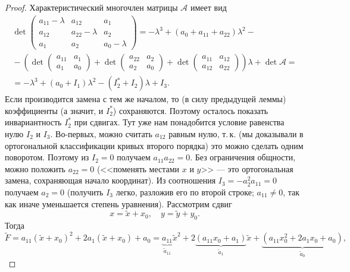 \begin{proof}
    Характеристический многочлен матрицы $\mathcal{A}$ имеет вид
    $$
    \begin{array}{c}\displaystyle
        \det
        \begin{pmatrix}
            a_{11} - \lambda & a_{12} & a_1\\
            a_{12} & a_{22} - \lambda & a_2\\
            a_1 & a_2 & a_0 - \lambda
        \end{pmatrix} = 
        -\lambda^3 + (a_0 + a_{11} + a_{22})\lambda^2 - {}\\\displaystyle {} - \left(
            \det
            \begin{pmatrix}
                a_{11} & a_1\\
                a_1 & a_0
            \end{pmatrix} + \det
            \begin{pmatrix}
                a_{22} & a_2\\
                a_2 & a_0
            \end{pmatrix} + \det
            \begin{pmatrix}
                a_{11} & a_{12}\\
                a_{12} & a_{22}
            \end{pmatrix}
        \right)\lambda + \det \mathcal{A} = {}\\\displaystyle {} = 
        -\lambda^3 + (a_0 + I_1)\lambda^2 - (I_2^\ast + I_2)\lambda + I_3.
    \end{array}
    $$
    Если производится замена с тем же началом, то (в силу предыдущей леммы) коэффициенты (а значит, и $I_2^\ast$) сохраняются. Поэтому осталось показать инвариантность $I_2^\ast$ при сдвигах. Тут уже нам понадобится условие равенства нулю $I_2$ и $I_3$. Во-первых, можно считать $a_{12}$ равным нулю, т.\,к. (мы доказывали в ортогональной классификации кривых второго порядка) это можно сделать одним поворотом. Поэтому из $I_2 = 0$ получаем $a_{11}a_{22} = 0$. Без ограничения общности, можно положить $a_{22} = 0$ (<<поменять местами $x$ и $y$>> --- это ортогональная замена, сохраняющая начало координат). Из соотношения $I_3 = -a_2^2a_{11} = 0$ получаем $a_2 = 0$ (получить $I_3$ легко, разложив его по второй строке; $a_{11} \ne 0$, так как иначе уменьшается степень уравнения). Рассмотрим сдвиг
    $$
    x = \widetilde{x} + x_0,\quad y = \widetilde{y} + y_0.
    $$
    Тогда
    $$
    \widetilde{F} = a_{11}(\widetilde{x} + x_0)^2 + 2a_1(\widetilde{x} + x_0) + a_0 = \underbrace{a_{11}}_{\widetilde{a}_{11}}\widetilde{x}^2 + 2\underbrace{(a_{11}x_0 + a_1)}_{\widetilde{a}_{1}}\widetilde{x} + \underbrace{(a_{11}x_0^2 + 2a_1x_0 + a_0)}_{\widetilde{a}_0},
$$
\end{proof}
